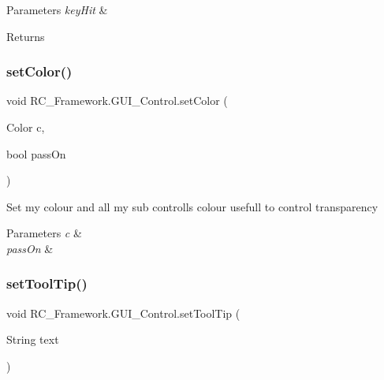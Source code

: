 \begin{DoxyParams}{Parameters}
{\em key\+Hit} & \\
\hline
\end{DoxyParams}
\begin{DoxyReturn}{Returns}

\end{DoxyReturn}
\mbox{\label{class_r_c___framework_1_1_g_u_i___control_a19b896ae0239a880458192de438e217c}} 
\subsubsection{\texorpdfstring{set\+Color()}{setColor()}}
{\footnotesize\ttfamily void R\+C\+\_\+\+Framework.\+G\+U\+I\+\_\+\+Control.\+set\+Color (\begin{DoxyParamCaption}\item[{Color}]{c,  }\item[{bool}]{pass\+On }\end{DoxyParamCaption})}



Set my colour and all my sub controlls colour usefull to control transparency 


\begin{DoxyParams}{Parameters}
{\em c} & \\
\hline
{\em pass\+On} & \\
\hline
\end{DoxyParams}
\mbox{\label{class_r_c___framework_1_1_g_u_i___control_ae53955f2d8f4a2be9dffbfabfe0901d7}} 
\subsubsection{\texorpdfstring{set\+Tool\+Tip()}{setToolTip()}}
{\footnotesize\ttfamily void R\+C\+\_\+\+Framework.\+G\+U\+I\+\_\+\+Control.\+set\+Tool\+Tip (\begin{DoxyParamCaption}\item[{String}]{text }\end{DoxyParamCaption})}



